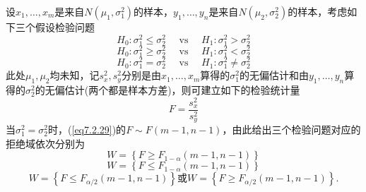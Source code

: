 设$x_{1},\dotsc,x_{m}$是来自$N(\mu_{ 1 },\sigma_{1}^{2})$的样本，$y_{1},\dotsc,y_{n}$是来自$N(\mu_{ 2 },\sigma_{2}^{2})$的样本，考虑如下三个假设检验问题
\begin{equation}\label{eq7.2.26}
H _ { 0 } : \sigma _ { 1 } ^ { 2 } \leq \sigma _ { 2 } ^ { 2 } \quad \text { vs } \quad H _ { 1 } : \sigma _ { 1 } ^ { 2 } > \sigma _ { 2 } ^ { 2 }
\end{equation}
\begin{equation}\label{eq7.2.27}
H _ { 0 } : \sigma _ { 1 } ^ { 2 } \geq \sigma _ { 2 } ^ { 2 } \quad \text { vs } \quad H _ { 1 } : \sigma _ { 1 } ^ { 2 } < \sigma _ { 2 } ^ { 2 }
\end{equation}
\begin{equation}\label{eq7.2.28}
H _ { 0 } : \sigma _ { 1 } ^ { 2 } = \sigma _ { 2 } ^ { 2 } \quad \text { vs } \quad H _ { 1 } : \sigma _ { 1 } ^ { 2 }\ne  \sigma _ { 2 } ^ { 2 }
\end{equation}
此处$\mu_{ 1 },\mu_{ 2 }$均未知，记$s_{x}^{2},s_{y}^{2}$分别是由$x_{1},\dotsc,x_{m}$算得的$\sigma_{ 1 }^{2}$的无偏估计和由$y_{1},\dotsc,y_{n}$算得的$\sigma_{ 2 }^{2}$的无偏估计(两个都是样本方差)，则可建立如下的检验统计量
\begin{equation}\label{eq7.2.29}
F = \frac { s _ { x } ^ { 2 } } { s _ { y } ^ { 2 } }
\end{equation}
当$\sigma_{ 1 }^{2}=\sigma_{ 2 }^{2}$时，(\ref{eq7.2.29})的$F\sim F(m-1,n-1)$，由此给出三个检验问题对应的拒绝域依次分别为
\[W = \left\{ F \geq F _ { 1 - \alpha} ( m - 1 , n - 1 ) \right\}\]
\[W = \left\{ F \leq F _ { 1 - \alpha } ( m - 1 , n - 1 ) \right\}\]
\[W = \left\{ F \leq F _ { \alpha / 2 } ( m - 1 , n - 1 )\right\}\text{或}W = \left\{ F \geq F _ { \alpha / 2 } ( m - 1 , n - 1 )\right\}.\]
